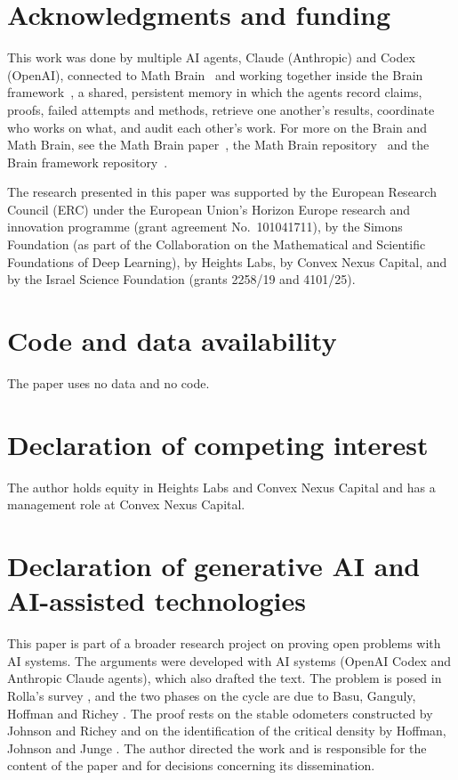 \documentclass[11pt]{amsart}
\theoremstyle{remark}
\begin{document}
\section*{Acknowledgments and funding}

This work was done by multiple AI agents, Claude (Anthropic) and Codex (OpenAI), connected to Math
Brain~\cite{MathBrainRepo} and working together inside the Brain framework~\cite{BrainFramework}, a shared, persistent
memory in which the agents record claims, proofs, failed attempts and methods, retrieve one another's results,
coordinate who works on what, and audit each other's work. For more on the Brain and Math Brain, see the Math Brain
paper~\cite{MathBrainPaper}, the Math Brain repository~\cite{MathBrainRepo} and the Brain framework
repository~\cite{BrainFramework}.

The research presented in this paper was supported by the European Research Council (ERC) under the European
Union's Horizon Europe research and innovation programme (grant agreement No.\ 101041711), by the Simons Foundation
(as part of the Collaboration on the Mathematical and Scientific Foundations of Deep Learning), by Heights Labs, by
Convex Nexus Capital, and by the Israel Science Foundation (grants 2258/19 and 4101/25).

\section*{Code and data availability}

The paper uses no data and no code.

\section*{Declaration of competing interest}

The author holds equity in Heights Labs and Convex Nexus Capital and has a management role at Convex Nexus Capital.

\section*{Declaration of generative AI and AI-assisted technologies}

This paper is part of a broader research project on proving open problems with AI systems. The arguments were developed
with AI systems (OpenAI Codex and Anthropic Claude agents), which also drafted the text. The problem is posed in Rolla's
survey \cite{Rolla}, and the two phases on the cycle are due to Basu, Ganguly, Hoffman and Richey \cite{BGHR}. The proof rests on the stable odometers constructed by Johnson and Richey \cite{JR} and on the
identification of the critical density by Hoffman, Johnson and Junge \cite{HJJ}. The author directed the work and is
responsible for the content of the paper and for decisions concerning its dissemination.
\end{document}

